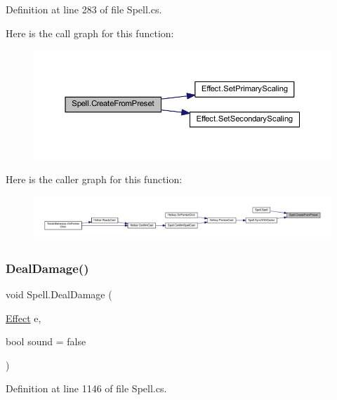 Definition at line 283 of file Spell.\+cs.

Here is the call graph for this function\+:
\nopagebreak
\begin{figure}[H]
\begin{center}
\leavevmode
\includegraphics[width=350pt]{class_spell_aee08370358e033af2bf7e0c4c2f2b2bd_cgraph}
\end{center}
\end{figure}
Here is the caller graph for this function\+:
\nopagebreak
\begin{figure}[H]
\begin{center}
\leavevmode
\includegraphics[width=350pt]{class_spell_aee08370358e033af2bf7e0c4c2f2b2bd_icgraph}
\end{center}
\end{figure}
\mbox{\label{class_spell_ad2e4f64f1f7ced4b69c55619d5fdb0b0}} 
\subsubsection{\texorpdfstring{DealDamage()}{DealDamage()}}
{\footnotesize\ttfamily void Spell.\+Deal\+Damage (\begin{DoxyParamCaption}\item[{\mbox{\hyperlink{class_effect}{Effect}}}]{e,  }\item[{bool}]{sound = {\ttfamily false} }\end{DoxyParamCaption})}



Definition at line 1146 of file Spell.\+cs.

